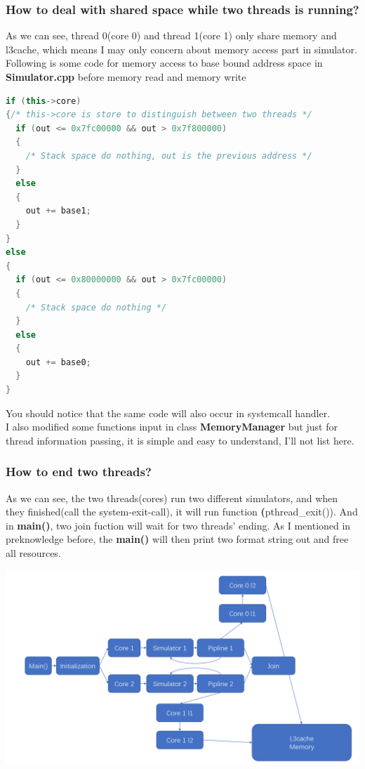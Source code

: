 \mathbb{R} \documentclass{article}
\begin{document}
\subsubsection{How to deal with shared space while two threads is running?}
As we can see, thread 0(core 0) and thread 1(core 1) only share memory and l3cache, which means I may only concern about memory access part in simulator.\\
Following is some code for memory access to base bound address space in \textbf{Simulator.cpp} before memory read and memory write
\begin{lstlisting}[language=c++]
if (this->core)
{/* this->core is store to distinguish between two threads */
  if (out <= 0x7fc00000 && out > 0x7f800000)
  {
    /* Stack space do nothing, out is the previous address */
  }
  else
  {
    out += base1;
  }
}
else
{
  if (out <= 0x80000000 && out > 0x7fc00000)
  {
    /* Stack space do nothing */
  }
  else
  {
    out += base0;
  }
} 
\end{lstlisting}
You should notice that the same code will also occur in systemcall handler.\\
I also modified some functions input in class \textbf{MemoryManager} but just for thread information passing, it is simple and easy to understand, I'll not list here.

\subsubsection{How to end two threads?}
As we can see, the two threads(cores) run two different simulators, and when they finished(call the system-exit-call), it will run function \textbf(pthread\_exit()). And in \textbf{main()}, two join fuction will wait for two threads' ending. As I mentioned in preknowledge before, the \textbf{main()} will then print two format string out and free all resources.
\begin{center}
  \includegraphics[scale = 0.28]{7.png}
\end{center}
\end{document}
